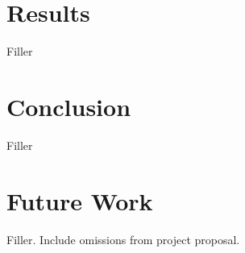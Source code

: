 \documentclass[10pt,twocolumn,letterpaper]{article}
\begin{document}



\section{Results}
\label{sec:results}
Filler

\section{Conclusion}
\label{sec:conclusion}
Filler

\section{Future Work}
Filler. Include omissions from project proposal.

{\small


}
\end{document}
